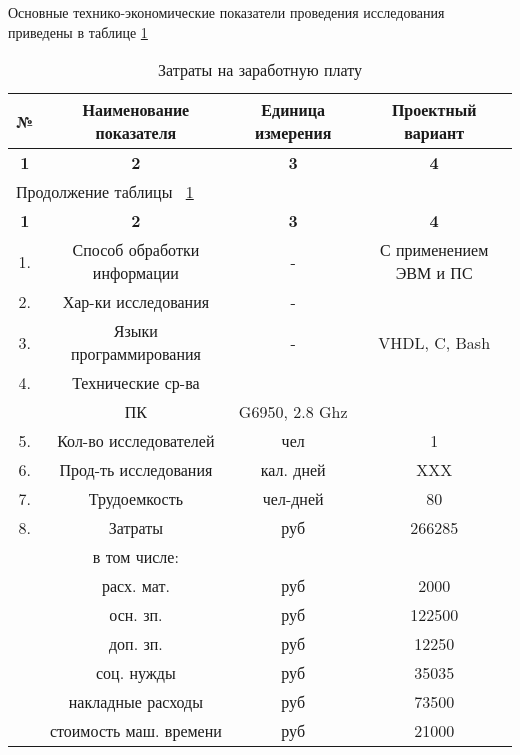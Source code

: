 Основные технико-экономические показатели проведения исследования приведены в таблице \ref{tab:eco_osn_tepp} 

\begin{center}
\begin{longtable}{|c|c|c|c|}
\caption{Затраты на заработную плату} \label{tab:eco_osn_tepp} \\ \hline
\multicolumn{1}{|c|}{\textbf{№}} & \multicolumn{1}{c|}{\textbf{Наименование показателя}} & 
\multicolumn{1}{p{3cm}|}{\textbf{Единица измерения}} &   \multicolumn{1}{c|}{\textbf{Проектный вариант}} \\ \hline 

\multicolumn{1}{|c|}{\textbf{1}} &   \multicolumn{1}{c|}{\textbf{2}} & 
\multicolumn{1}{c|}{\textbf{3}} & \multicolumn{1}{c|}{\textbf{4}} \\ \hline
\endfirsthead

\multicolumn{4}{|l|}{{Продолжение таблицы ~\ref{tab:eco_osn_tepp}}} \\ %
\hline
\multicolumn{1}{|c|}{\textbf{1}} &   \multicolumn{1}{c|}{\textbf{2}} & 
\multicolumn{1}{c|}{\textbf{3}} & \multicolumn{1}{c|}{\textbf{4}} \\ \hline
\endhead

\endfoot

\hline
\endlastfoot

1. & Способ обработки информации & - & С применением ЭВМ и ПС  \\ \hline
2. & Хар-ки исследования & - &   \\ \hline
3. & Языки программирования & - & VHDL, C, Bash  \\ \hline
4. & Технические ср-ва & & \\ \hline
   & ПК & G6950, 2.8 Ghz  \\ \hline
5. & Кол-во исследователей & чел & 1  \\ \hline
6. & Прод-ть исследования & кал. дней & XXX  \\ \hline
7. & Трудоемкость & чел-дней & 80  \\ \hline
8. & Затраты & руб & 266285  \\ \hline
   & в том числе: &  & \\ \hline
   & расх. мат. & руб & 2000 \\ \hline
   & осн. зп.  & руб & 122500 \\ \hline
   & доп. зп.  & руб & 12250 \\ \hline
   & соц. нужды  & руб & 35035 \\ \hline
   & накладные расходы & руб & 73500 \\ \hline
   & стоимость маш. времени & руб &  21000\\ \hline

\end{longtable}
\end{center}

